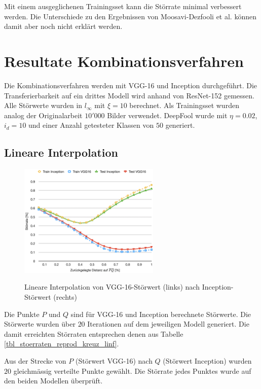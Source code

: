 \documentclass{FFHS_Thesis_Additions/ffhsthesis}
\begin{document}
Mit einem ausgeglichenen Trainingsset kann die Störrate minimal verbessert werden. 
Die Unterschiede zu den Ergebnissen von Moosavi-Dezfooli et al. können damit aber noch nicht erklärt werden.


\chapter{Resultate Kombinationsverfahren}
\label{c_resultate_optimierung}

Die Kombinationsverfahren werden mit VGG-16 und Inception durchgeführt. 
Die Transferierbarkeit auf ein drittes Modell wird anhand von ResNet-152 gemessen. 
Alle Störwerte wurden in $l_\infty$ mit $\xi=10$ berechnet. 
Als Trainingsset wurden analog der Originalarbeit $10'000$ Bilder verwendet. 
DeepFool wurde mit $\eta=0.02$, $i_d=10$ und einer Anzahl getesteter Klassen von $50$ generiert.


\section{Lineare Interpolation}

\begin{figure}[h]
\caption{Lineare Interpolation von VGG-16-Störwert (links) nach Inception-Störwert (rechts)}
\centering
\includegraphics[width=0.6\textwidth]{./images/stoerrate_interpolate.png}
\label{fig_stoerrate_interpolate}
\end{figure}

Die Punkte $P$ und $Q$ sind für VGG-16 und Inception berechnete Störwerte. Die Störwerte wurden über $20$ Iterationen auf dem jeweiligen Modell generiert. Die damit erreichten Störraten entsprechen denen aus Tabelle \ref{tbl_stoerraten_reprod_kreuz_linf}.
 
Aus der Strecke von $P$ (Störwert VGG-16) nach $Q$ (Störwert Inception) wurden $20$ gleichmässig verteilte Punkte gewählt. 
Die Störrate jedes Punktes wurde auf den beiden Modellen überprüft.
\end{document}

